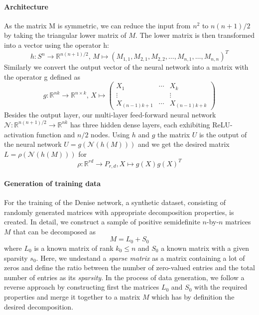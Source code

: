 \paragraph{Architecture}
As the matrix M is symmetric, we can reduce the input from $n^2$ to $n(n + 1)/2$ by taking the triangular lower matrix of $M$. The lower matrix is then transformed into a vector using the operator h:
\[
h: S^n \to \mathbb{R}^{n(n+1)/2}, \, M \mapsto (M_{1,1},M_{2,1},M_{2,2},\dots,M_{n,1},\dots,M_{n,n})^T
\]
Similarly we convert the output vector of the neural network into a matrix with the operator g defined as
\[
g : \mathbb{R}^{nk} \to \mathbb{R}^{n \times k}, \, X \mapsto \begin{pmatrix} X_1 & \cdots & X_k \\ \vdots & & \vdots \\ X_{(n-1)k + 1} & \cdots& X_{(n-1)k+k}\end{pmatrix}
\]
Besides the output layer, our multi-layer feed-forward neural network $\mathcal{N}: \mathbb{R}^{n(n+1)/2} \to \mathbb{R}^{nk} $ has three hidden dense layers, each exhibiting ReLU-activation function and $n/2$ nodes. Using $h$ and $g$ the matrix $U$ is the output of the neural network $U = g(\mathcal{N}(h(M)))$ and we  get the desired matrix $L=\rho(\mathcal{N}(h(M)))$ for
\[
\rho : \mathbb{R}^{rd} \to P_{r,d}, X \mapsto g(X)g(X)^T
\]


\paragraph{Generation of training data}
For the training of the Denise network, a synthetic dataset, consisting of randomly generated matrices with appropriate decomposition properties, is created. In detail, we construct a sample of positive semidefinite $n$-by-$n$ matrices $M$ that can be decomposed as
\[
 M = L_0 + S_0
\]
where $L_0$ is a known matrix of rank $k_0 \leq n$ and $S_0$ a known matrix with a given sparsity $s_0$. Here, we undestand a \textit{sparse matrix} as a matrix containing a lot of zeros and define the ratio between the number of zero-valued entries and the total number of entries as its \textit{sparsity}. In the process of data generation, we follow a reverse approach by constructing first the matrices $L_0$ and $S_0$ with the required properties and merge it together to a matrix $M$ which has by definition the desired decomposition.

